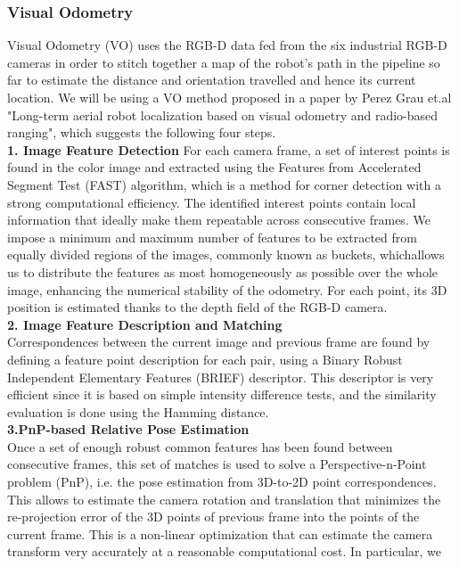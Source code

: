 \documentclass[11pt]{article}		%
\begin{document}
	\subsubsection{Visual Odometry}
	Visual Odometry (VO) uses the RGB-D data fed from the six industrial RGB-D cameras in order to stitch together a map of the robot's path in the pipeline so far to estimate the distance and orientation travelled and hence its current location. We will be using a VO method proposed in a paper by Perez Grau et.al "Long-term aerial robot localization based on visual odometry and radio-based ranging", which suggests the following four steps.
	\\\textbf{1. Image Feature Detection}
	For each camera frame, a set of interest points is found in the color image and extracted using the Features from Accelerated Segment Test (FAST) algorithm, which is a method for corner detection with a strong computational efficiency. The identified interest points contain local information that ideally make them repeatable across consecutive frames. We impose a minimum and maximum number of features to be extracted from equally divided
    regions of the images, commonly known as buckets, whichallows us to distribute the features as most
    homogeneously as possible over the whole image, enhancing the numerical stability of the odometry.
    For each point, its 3D position is estimated thanks to the depth field of the RGB-D camera.
	\\\textbf{2. Image Feature Description and Matching}
\\Correspondences between the current image and previous frame are found by defining a feature point description for each pair, using a Binary Robust Independent Elementary Features (BRIEF) descriptor. This descriptor is very efficient since it is based on simple intensity difference tests, and the similarity evaluation is done using the Hamming distance. 
    \\\textbf{3.PnP-based Relative Pose Estimation}
    \\Once a set of enough robust common features has been found between consecutive frames, this
set of matches is used to solve a Perspective-n-Point problem (PnP), i.e. the pose estimation from 3D-to-2D point correspondences. This allows to estimate the camera rotation and translation that minimizes the re-projection error of the 3D points of previous frame into the points of the current frame. This is a non-linear optimization that can
estimate the camera transform very accurately at a reasonable computational cost. In particular, we
\end{document}
